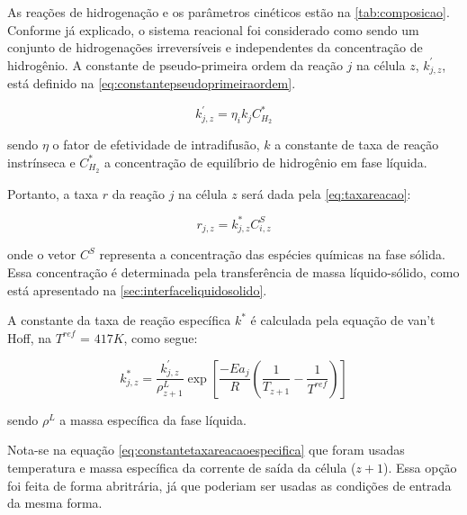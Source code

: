 As reações de hidrogenação e os parâmetros cinéticos estão na
\autoref{tab:composicao}. Conforme já explicado, o sistema reacional foi
considerado como sendo um conjunto de hidrogenações irreversíveis e
independentes da concentração de hidrogênio. A constante de pseudo-primeira
ordem da reação $j$ na célula $z$, $k^{'}_{j,z}$, está definido na
\autoref{eq:constantepseudoprimeiraordem}.

\begin{equation}
k^{'}_{j,z} = \eta_ik_jC^{*}_{H_2}
\label{eq:constantepseudoprimeiraordem}
\end{equation}

sendo $\eta$ o fator de efetividade de intradifusão, $k$ a
constante de taxa de reação instrínseca e $C^{*}_{H_2}$ a concentração de
equilíbrio de hidrogênio em fase líquida.


Portanto, a taxa $r$ da reação $j$ na célula $z$ será dada pela
\autoref{eq:taxareacao}:

\begin{equation}
r_{j,z} = k^{*}_{j,z}C^{S}_{i,z}
\label{eq:taxareacao}
\end{equation}

onde o vetor $C^{S}$ representa a concentração das espécies químicas na fase
sólida. Essa concentração é determinada pela transferência de massa
líquido-sólido, como está apresentado na \autoref{sec:interfaceliquidosolido}.

A constante da taxa de reação específica $k^{*}$ é calculada pela
equação de van't Hoff, na $T^{ref}$ = $417 K$, como segue:

\begin{equation}
k^{*}_{j,z} = \dfrac{k^{'}_{j,z}} {\rho^{L}_{z+1}} \exp
\left[{\dfrac{-Ea_j}{R} \left (\dfrac{1}{T_{z+1}} -
\dfrac{1}{T^{ref}} \right )}\right]
\label{eq:constantetaxareacaoespecifica}
\end{equation}

sendo $\rho^L$ a massa específica da fase líquida.

Nota-se na equação \autoref{eq:constantetaxareacaoespecifica} que foram usadas
temperatura e massa específica da corrente de saída da célula ($z+1$). Essa
opção foi feita de forma abritrária, já que poderiam ser usadas as condições de
entrada da mesma forma.

